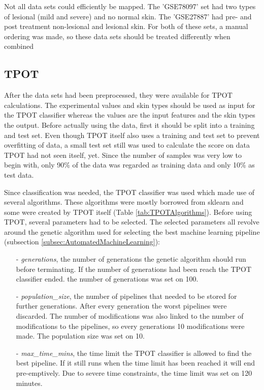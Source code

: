 \documentclass[10pt,a4paper]{article}
\begin{document}
	Not all data sets could efficiently be mapped. The 'GSE78097' set had two types of lesional (mild and severe) and no normal skin. The 'GSE27887' had pre- and post treatment non-lesional and lesional skin. For both of these sets, a manual ordering was made, so these data sets should be treated differently when combined
	
	
	\subsection{TPOT}
	\label{subsec:MethodsTPOT}
	
	After the data sets had been preprocessed, they were available for TPOT calculations. The experimental values and skin types should be used as input for the TPOT classifier whereas the values are the input features and the skin types the output. Before actually using the data, first it should be split into a training and test set. Even though TPOT itself also uses a training and test set to prevent overfitting of data, a small test set still was used to calculate the score on data TPOT had not seen itself, yet. Since the number of samples was very low to begin with, only 90\% of the data was regarded as training data and only 10\% as test data.
	
	 Since classification was needed, the TPOT classifier was used which made use of several algorithms. These algorithms were mostly borrowed from sklearn and some were created by TPOT itself (Table \ref{tab:TPOTAlgorithms}). Before using TPOT, several parameters had to be selected. The selected parameters all revolve around the genetic algorithm used for selecting the best machine learning pipeline (subsection \ref{subsec:AutomatedMachineLearning}):
	 
	 \begin{enumerate}
	 	\item[-] \textit{generations}, the number of generations the genetic algorithm should run before terminating. If the number of generations had been reach the TPOT classifier ended. the number of generations was set on 100.
	 	\item[-] \textit{population\_size}, the number of pipelines that needed to be stored for further generations. After every generation the worst pipelines were discarded. The number of modifications was also linked to the number of modifications to the pipelines, so every generations 10 modifications were made. The population size was set on 10.
	 	\item[-] \textit{max\_time\_mins}, the time limit the TPOT classifier is allowed to find the best pipeline. If it still runs when the time limit has been reached it will end pre-emptively. Due to severe time constraints, the time limit was set on 120 minutes. 
	 \end{enumerate}
	
\end{document}
